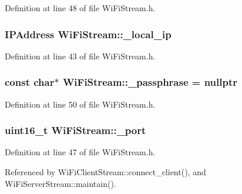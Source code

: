 Definition at line 48 of file Wi\+Fi\+Stream.\+h.

\subsubsection[{\texorpdfstring{\+\_\+local\+\_\+ip}{\_local\_ip}}]{\setlength{\rightskip}{0pt plus 5cm}I\+P\+Address Wi\+Fi\+Stream\+::\+\_\+local\+\_\+ip\hspace{0.3cm}{\ttfamily [protected]}}\hypertarget{class_wi_fi_stream_a9e5cfe85f7ff186e597e2eb09a75e742}{}\label{class_wi_fi_stream_a9e5cfe85f7ff186e597e2eb09a75e742}


Definition at line 43 of file Wi\+Fi\+Stream.\+h.

\subsubsection[{\texorpdfstring{\+\_\+passphrase}{\_passphrase}}]{\setlength{\rightskip}{0pt plus 5cm}const char$\ast$ Wi\+Fi\+Stream\+::\+\_\+passphrase = nullptr\hspace{0.3cm}{\ttfamily [protected]}}\hypertarget{class_wi_fi_stream_a56fb4c68bcf7312361a8fad4328826de}{}\label{class_wi_fi_stream_a56fb4c68bcf7312361a8fad4328826de}


Definition at line 50 of file Wi\+Fi\+Stream.\+h.

\subsubsection[{\texorpdfstring{\+\_\+port}{\_port}}]{\setlength{\rightskip}{0pt plus 5cm}uint16\+\_\+t Wi\+Fi\+Stream\+::\+\_\+port\hspace{0.3cm}{\ttfamily [protected]}}\hypertarget{class_wi_fi_stream_aa1137c9058f501876b0967db2baf898a}{}\label{class_wi_fi_stream_aa1137c9058f501876b0967db2baf898a}


Definition at line 47 of file Wi\+Fi\+Stream.\+h.



Referenced by Wi\+Fi\+Client\+Stream\+::connect\+\_\+client(), and Wi\+Fi\+Server\+Stream\+::maintain().

